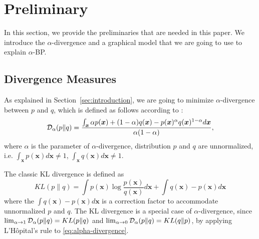 \documentclass[conference]{IEEEtran}
\begin{document}





\section{Preliminary}\label{sec:preliminary}
In this section, we provide the preliminaries that are needed in this paper. We introduce the $\alpha$-divergence and a graphical model that we are going to use to explain $\alpha$-BP.

\subsection{Divergence Measures}
As explained in Section~\ref{sec:introduction}, we are going to minimize $\alpha$-divergence between $p$ and $q$, which is defined as follows according to \cite{Zhu95informationgeometric}\cite{divergence-measures-and-message-passing}: \\
\begin{equation}\label{eq:alpha-divergence}
  \mathcal{D}_{\alpha}(p \| q ) = \frac{\int_{\bm{x}} \alpha p(\bm{x}) + (1-\alpha) q (\bm{x}) - p(\bm{x})^{\alpha} q(\bm{x})^{1-\alpha} d\bm{x}}{\alpha(1-\alpha)},
\end{equation}
where $\alpha$ is the parameter of $\alpha$-divergence, distribution $p$ and $q$ are unnormalized, i.e. $\int_{\bm{x}}p(\bm{x}) d\bm{x} \neq 1$, $\int_{\bm{x}}q(\bm{x}) d\bm{x} \neq 1$.

The classic KL divergence is defined as
\begin{equation}
  KL(p \| q) = \int p(\bm{x}) \log{\frac{p(\bm{x})}{q(\bm{x})}} d \bm{x}+ \int q(\bm{x}) - p(\bm{x}) d\bm{x}
\end{equation}
where the $\int q(\bm{x}) - p(\bm{x}) d\bm{x}$ is a correction factor to accommodate unnormalized $p$ and $q$. The KL divergence is a special case of $\alpha$-divergence, since $\lim_{\alpha \rightarrow 1}\mathcal{D}_{\alpha}(p \| q ) = KL(p\|q)$ and $\lim_{\alpha \rightarrow 0}\mathcal{D}_{\alpha}(p \| q ) = KL(q\|p)$, by applying L'H\^opital's rule to \autoref{eq:alpha-divergence}.
\end{document}
